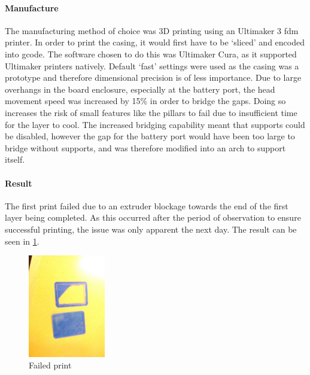 \paragraph{Manufacture}
\label{sec:case1manufacture}
The manufacturing method of choice was 3D printing using an Ultimaker 3 \gls{fdm} printer.
In order to print the casing, it would first have to be `sliced' and encoded into \gls{gcode}.
The software chosen to do this was Ultimaker Cura, as it supported Ultimaker printers natively.
Default `fast' settings were used as the casing was a prototype and therefore dimensional
precision is of less importance. Due to large overhangs in the board enclosure, especially at
the battery port, the head movement speed was increased by 15\% in order to bridge the gaps.
Doing so increases the risk of small features like the pillars to fail due to insufficient time
for the layer to cool. The increased bridging capability meant that supports could be disabled,
however the gap for the battery port would have been too large to bridge without supports,
and was therefore modified into an arch to support itself.

\paragraph{Result}
The first print failed due to an extruder blockage towards the end of the first layer
being completed. As this occurred after the period of observation to ensure successful
printing, the issue was only apparent the next day. The result can be seen in \cref{fig:failedprint}.


\begin{figure}
    \centering
    \includegraphics[width=0.3\textwidth]{../figures/Pics/failedprint.jpg}
    \caption{Failed print}
    \label{fig:failedprint}
\end{figure}

